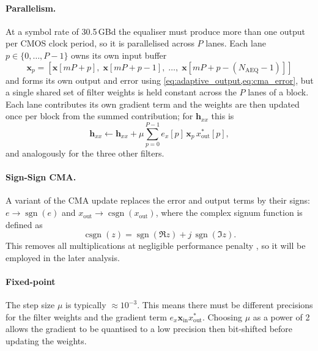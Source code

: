 \documentclass[12pt,a4paper]{report}
\begin{document}
\paragraph{Parallelism.}
\label{sec:aeq_parallel}
At a symbol rate of 30.5\,GBd the equaliser must produce more than one output per CMOS clock period, so it is parallelised across $P$ lanes. Each lane $p \in \{0,\dots,P-1\}$ owns its own input buffer
\begin{equation}
    \mathbf{x}_p = \left[\mathbf{x}[mP + p],\; \mathbf{x}[mP + p - 1],\; \dots,\; \mathbf{x}[mP + p - (N_\mathrm{AEQ}-1)]\right]
    \label{eq:aeq_lane_input}
\end{equation}
and forms its own output and error using \cref{eq:adaptive_output,eq:cma_error}, but a single shared set of filter weights is held constant across the $P$ lanes of a block. Each lane contributes its own gradient term and the weights are then updated once per block from the summed contribution; for $\mathbf{h}_{xx}$ this is
\begin{equation}
    \mathbf{h}_{xx} \leftarrow \mathbf{h}_{xx} + \mu \sum_{p=0}^{P-1} e_x[p]\,\mathbf{x}_p\,x_\mathrm{out}^*[p],
    \label{eq:aeq_parallel_update}
\end{equation}
and analogously for the three other filters.

\paragraph{Sign-Sign CMA.}
\label{sec:sign_sign_cma}
A variant of the CMA update replaces the error and output terms by their signs: $e \to \operatorname{sgn}(e)$ and $x_\mathrm{out} \to \operatorname{csgn}(x_\mathrm{out})$, where the complex signum function is defined as
\begin{equation}
    \operatorname{csgn}(z) = \operatorname{sgn}(\Re z) + j\,\operatorname{sgn}(\Im z).
    \label{eq:csgn}
\end{equation}
This removes all multiplications at negligible performance penalty \cite{Cardenas:14}, so it will be employed in the later analysis.

\paragraph{Fixed-point}
The step size $\mu$ is typically $\approx 10^{-3}$. This means there must be different precisions for the filter weights and the gradient term $e_x\mathbf{x}_\mathrm{in}x_\mathrm{out}^*$. Choosing $\mu$ as a power of 2 allows the gradient to be quantised to a low precision then bit-shifted before updating the weights.
\end{document}
